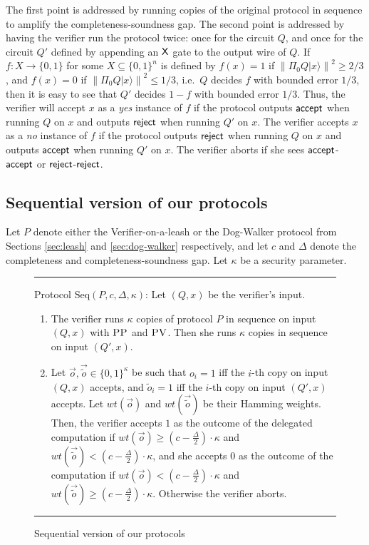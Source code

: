\documentclass[11pt]{article}
\theoremstyle{remark}
\theoremstyle{definition}
\newcommand{\ket}[1]{|#1\rangle}
\newcommand{\norm}[1]{\left\|#1\right\|}
\newcommand{\pv}{\textsc{PV}}
\newcommand{\pp}{\textsc{PP}}
\begin{document}
The first point is addressed by running copies of the original protocol in sequence to amplify the completeness-soundness gap. The second point is addressed by having the verifier run the protocol twice: once for the circuit $Q$, and once for the circuit $Q'$ defined by appending an $\sf X$ gate to the output wire of $Q$. If $f:X\rightarrow \{0,1\}$ for some $X\subseteq \{0,1\}^n$ is defined by $f(x)=1$ if $\norm{\Pi_0 Q\ket{x}}^2\geq 2/3$, and $f(x)=0$ if $\norm{\Pi_0 Q\ket{x}}^2\leq 1/3$, i.e.\ $Q$ decides $f$ with bounded error $1/3$, then it is easy to see that $Q'$ decides $1-f$ with bounded error $1/3$. Thus, the verifier will accept $x$ as a \textit{yes} instance of $f$ if the protocol outputs ${\sf accept}$ when running $Q$ on $x$ and outputs $\sf reject$ when running $Q'$ on $x$. The verifier accepts $x$ as a \textit{no} instance of $f$ if the protocol outputs $\sf reject$ when running $Q$ on $x$ and outputs $\sf accept$ when running $Q'$ on $x$. The verifier aborts if she sees $\sf accept$-$\sf accept$ or $\sf reject$-$\sf reject$. 



\subsection{Sequential version of our protocols}

Let $P$ denote either the Verifier-on-a-leash or the Dog-Walker protocol from Sections \ref{sec:leash} and \ref{sec:dog-walker} respectively, and let $c$ and $\Delta$ denote the completeness and completeness-soundness gap. Let $\kappa$ be a security parameter.

\begin{figure}[H]
\rule[1ex]{16.5cm}{0.5pt}
\justify
Protocol $\mbox{Seq}(P,c,\Delta, \kappa)$: Let $(Q,x)$ be the verifier's input. 
\begin{enumerate}
\item The verifier runs $\kappa$ copies of protocol $P$ in sequence on input $(Q,x)$ with $\pp$ and $\pv$. Then she runs $\kappa$ copies in sequence on input $(Q',x)$. 
\item Let $\vec{o}, \vec{\tilde{o}} \in \{0,1\}^{\kappa}$ be such that $o_i = 1$ iff the $i$-th copy on input $(Q,x)$ accepts, and $\tilde{o}_i = 1$ iff the $i$-th copy on input $(Q',x)$ accepts. Let $wt(\vec{o})$ and $wt(\vec{\tilde{o}})$ be their Hamming weights. Then, the verifier accepts $1$ as the outcome of the delegated computation if $wt(\vec{o}) \geq (c- \frac{\Delta}{2}) \cdot \kappa$ and $wt(\vec{\tilde{o}}) < (c- \frac{\Delta}{2}) \cdot \kappa$, and she accepts $0$ as the outcome of the computation if $wt(\vec{o}) < (c- \frac{\Delta}{2})\cdot \kappa$ and $wt(\vec{\tilde{o}}) \geq (c- \frac{\Delta}{2}) \cdot \kappa$. Otherwise the verifier aborts.

\end{enumerate}
\rule[2ex]{16.5cm}{0.5pt}\vspace{-.5cm}
\caption{Sequential version of our protocols} \label{fig: gardenhose-protocol-parallel}
\end{figure}
\end{document}
